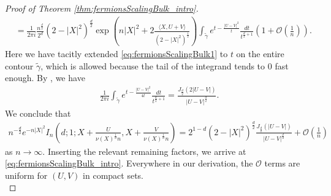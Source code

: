 \documentclass[%
 jmp,
cp,  %
 amsmath,amsthm,amssymb,%
 reprint,%
onecolumn]{revtex4-2}
\newtheorem{theorem}{Theorem}[section]
\begin{document}
\begin{proof}[Proof of Theorem \ref{thm:fermionsScalingBulk_intro}]
\begin{align*}
&= \frac{1}{2\pi i} \frac{n^{\frac{d}{2}}}{2^d} \left(2-\lvert X\rvert^2\right)^\frac{d}{2} 
\exp\left(n\lvert X\rvert^2+2\frac{\langle X,U+V\rangle}{(2-|X|^2)^{\frac12}}\right) \int_{\tilde\gamma} e^{t - \frac{\lvert U-V\rvert^2}{t}} \frac{dt}{t^{\frac{d}{2}+1}}
\left(1+\mathcal O\left(\frac{1
}{n}\right)\right).
\end{align*}
Here we have tacitly extended \eqref{eq:fermionsScalingBulk1} to $t$ on the entire contour $\tilde\gamma$, which is allowed because the tail of the integrand tends to $0$ fast enough. By \cite[10.9.19]{DLMF}, we have
\begin{align*}
\frac{1}{2\pi i}\int_{\tilde\gamma} e^{t - \frac{\lvert U-V\rvert^2}{4 t}} \frac{dt}{t^{\frac{d}{2}+1}}
= 
\frac{J_\frac{d}{2}\left(2\lvert U-V\rvert\right)}{\lvert U-V\rvert^\frac{d}{2}}.
\end{align*}
We conclude that
\begin{align*}
n^{-\frac{d}{2}} e^{-n \lvert X\rvert^2} I_n\left(d;1;X+\frac{U}{\nu(X)^\frac{1}{d} n}, X + \frac{V}{\nu(X)^\frac{1}{d} n}\right)
= 2^{1-d}(2-\lvert X\rvert^2)^\frac{d}{2} \frac{J_\frac{d}{2}\left(\lvert U-V\rvert\right)}{\lvert U-V\rvert^\frac{d}{2}}
+\mathcal O\left(\frac{1}{n}\right)
\end{align*}
as $n\to\infty$. Inserting the relevant remaining factors, we arrive at \eqref{eq:fermionsScalingBulk_intro}. Everywhere in our derivation, the $\mathcal O$ terms are uniform for $(U,V)$ in compact sets.\\ 
\end{proof}


\end{document}
